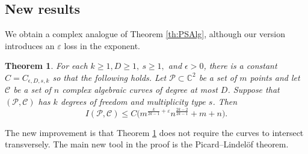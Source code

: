 \documentclass[letterpaper, reqno,11pt]{article}
\newtheorem{theorem}{Theorem}[section]
\theoremstyle{remark}
\newcommand{\RR}{\mathbb{R}}
\newcommand{\CC}{\mathbb{C}}
\newcommand{\pts}{\mathcal P}
\newcommand{\curves}{\mathcal C}
\newcommand{\eps}{\varepsilon}
\newcommand{\ignore}[1]{}
\begin{document}
\subsection{New results}
We obtain a complex analogue of Theorem \ref{th:PSAlg}, although our version introduces an $\eps$ loss in the exponent.

\begin{theorem} \label{th:comPS}
For each $k\geq 1, D\geq 1,\ s\geq 1,$ and $\epsilon>0$, there is a constant $C=C_{\epsilon,D,s,k}$ so that the following holds. Let $\pts\subset\CC^2$ be a set of $m$ points and let $\curves$ be a set of $n$ complex algebraic curves of degree at most $D$. Suppose that $(\pts,\curves)$ has $k$ degrees of freedom and multiplicity type $s$. Then
\begin{equation}\label{comPSThmEqn}
I(\pts,\curves) \le C\big(m^{\frac{k}{2k-1}+\eps}n^{\frac{2k-2}{2k-1}}+m+n\big).
\end{equation}
\end{theorem}

The new improvement is that Theorem \ref{th:comPS} does not require the curves to intersect transversely.
The main new tool in the proof is the Picard--Lindel\"of theorem.

\ignore{ %
\subsection{Proof sketch}
Each point of $\pts$ can be regarded as a point in $\RR^4$, and each curve of $\curves$ can be regarded as a two-dimensional variety in $\RR^4$. Thus the problem is reduced to bounding the number of incidences between a set of points in $\RR^4$ and a set $\mathcal{S}$ of two-dimensional surfaces in $\RR^4$. If every pair (or at least most pairs) of surfaces in $\mathcal{S}$ intersect transversely, then the bound \eqref{comPSThmEqn} can be obtained by using the techniques of Solymosi and Tao from \cite{ST}. However, if many pairs of surfaces in $\mathcal{S}$ fail to intersect transversely, then the techniques from \cite{ST} do not apply.

Luckily, the surfaces in $\mathcal{S}$ are special---they come from complex curves in $\CC^2$. More precisely, the surfaces in $\mathcal{S}$ are the images of complex curves in $\CC^2$ under the usual embedding of $\CC^2$ into $\RR^4$.
As we will show below, this means that the only way that many surfaces in $\mathcal{S}$ can lie in a common low-degree hypersurface $Z$ is if they intersect only in singular points of $Z$.
} %
\end{document}
